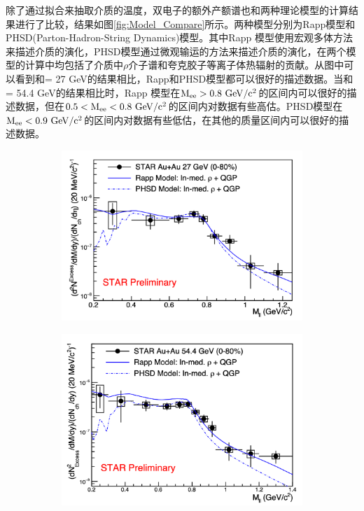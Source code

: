 除了通过拟合来抽取介质的温度，双电子的额外产额谱也和两种理论模型的计算结果进行了比较，结果如图\ref{fig:Model_Compare}所示。两种模型分别为Rapp模型\cite{Rapp:2014hha, Rapp:2000pe, Rapp:2013nxa}和PHSD(Parton-Hadron-String Dynamics)模型\cite{Bratkovskaya:2007jk, Bratkovskaya:1996qe, Song:2018xca}。其中Rapp 模型使用宏观多体方法来描述介质的演化，PHSD模型通过微观输运的方法来描述介质的演化，在两个模型的计算中均包括了介质中$\rho$介子谱和夸克胶子等离子体热辐射的贡献。从图中可以看到和\sNN = 27 GeV的结果相比，Rapp和PHSD模型都可以很好的描述数据。当和\sNN = 54.4 GeV的结果相比时，Rapp 模型在$\rm{M_{ee} > 0.8~GeV/c^2}$的区间内可以很好的描述数据，但在$\rm{ 0.5 < M_{ee} < 0.8~GeV/c^2}$的区间内对数据有些高估。PHSD模型在$\rm{M_{ee} < 0.9~GeV/c^2}$的区间内对数据有些低估，在其他的质量区间内可以很好的描述数据。
\begin{figure}[htb]
    \centering
    \begin{subfigure}[b]{0.45\textwidth}
        \centering
        \includegraphics[width=\textwidth,clip]{figures/Chapter5/Model_Compare_27.png}
        \caption{}
        \label{fig:Model_Compare_27}
    \end{subfigure}
    \hfill
    \begin{subfigure}[b]{0.45\textwidth}
        \centering
        \includegraphics[width=\textwidth,clip]{figures/Chapter5/Model_Compare_54.png}

\end{subfigure}
\end{figure}
